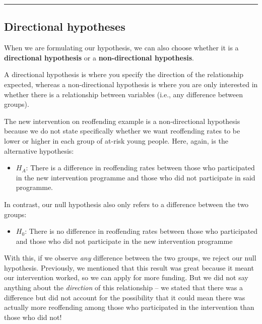 \documentclass[
]{book}
\providecommand{\tightlist}{%
  \setlength{\itemsep}{0pt}\setlength{\parskip}{0pt}}
\begin{document}
\begin{center}\rule{0.5\linewidth}{0.5pt}\end{center}

\hypertarget{directional-hypotheses}{%
\subsection{Directional hypotheses}\label{directional-hypotheses}}

When we are formulating our hypothesis, we can also choose whether it is a \textbf{directional hypothesis} or a \textbf{non-directional hypothesis}.

A directional hypothesis is where you specify the direction of the relationship expected, whereas a non-directional hypothesis is where you are only interested in whether there is a relationship between variables (i.e., any difference between groups).

The new intervention on reoffending example is a non-directional hypothesis because we do not state specifically whether we want reoffending rates to be lower or higher in each group of at-risk young people. Here, again, is the alternative hypothesis:

\begin{itemize}
\tightlist
\item
  \(H_A\): There is a difference in reoffending rates between those who participated in the new intervention programme and those who did not participate in said programme.
\end{itemize}

In contrast, our null hypothesis also only refers to a difference between the two groups:

\begin{itemize}
\tightlist
\item
  \(H_0\): There is no difference in reoffending rates between those who participated and those who did not participate in the new intervention programme
\end{itemize}

With this, if we observe \emph{any} difference between the two groups, we reject our null hypothesis. Previously, we mentioned that this result was great because it meant our intervention worked, so we can apply for more funding. But we did not say anything about the \emph{direction} of this relationship -- we stated that there was a difference but did not account for the possibility that it could mean there was actually more reoffending among those who participated in the intervention than those who did not!
\end{document}
